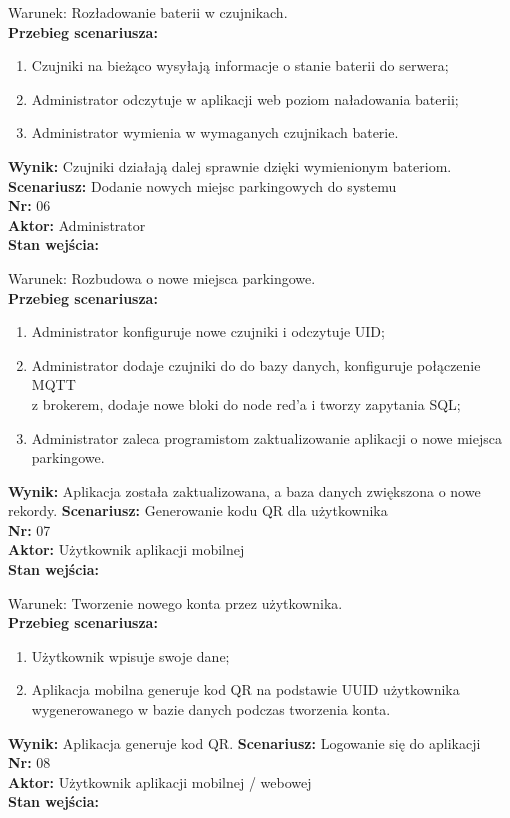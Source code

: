 \documentclass[12pt,a4paper]{article}
\begin{document}
Warunek: Rozładowanie baterii w czujnikach.
\\{\bf Przebieg scenariusza:}
\begin{enumerate}
\item Czujniki na bieżąco wysyłają informacje o stanie baterii do serwera;
\item Administrator odczytuje w aplikacji web poziom naładowania baterii;
\item Administrator wymienia w wymaganych czujnikach baterie.
\end{enumerate}
{\bf Wynik:} Czujniki działają dalej sprawnie dzięki wymienionym bateriom.
\newline\newline
{\large \bf Scenariusz:} Dodanie nowych miejsc parkingowych do systemu
\\{\bf Nr:} 06
\\{\bf Aktor:} Administrator
\\{\bf Stan wejścia:}

Warunek: Rozbudowa o nowe miejsca parkingowe.
\\{\bf Przebieg scenariusza:}
\begin{enumerate}
\item Administrator konfiguruje nowe czujniki i odczytuje UID;
\item Administrator dodaje czujniki do do bazy danych, konfiguruje połączenie MQTT\\z brokerem, dodaje nowe bloki do node red’a i tworzy zapytania SQL;
\item Administrator zaleca programistom zaktualizowanie aplikacji o nowe miejsca\\parkingowe.
\end{enumerate}
{\bf Wynik:} Aplikacja została zaktualizowana, a baza danych zwiększona o nowe rekordy.
\newline\newline
{\large \bf Scenariusz:} Generowanie kodu QR dla użytkownika
\\{\bf Nr:} 07
\\{\bf Aktor:} Użytkownik aplikacji mobilnej
\\{\bf Stan wejścia:}

Warunek: Tworzenie nowego konta przez użytkownika.
\\{\bf Przebieg scenariusza:}
\begin{enumerate}
\item Użytkownik wpisuje swoje dane;
\item Aplikacja mobilna generuje kod QR  na podstawie UUID użytkownika wygenerowanego w bazie danych podczas tworzenia konta.
\end{enumerate}
{\bf Wynik:} Aplikacja generuje kod QR.
\newline\newline\newline\newline\newline
{\large \bf Scenariusz:} Logowanie się do aplikacji
\\{\bf Nr:} 08
\\{\bf Aktor:} Użytkownik aplikacji mobilnej / webowej
\\{\bf Stan wejścia:}
\end{document}
